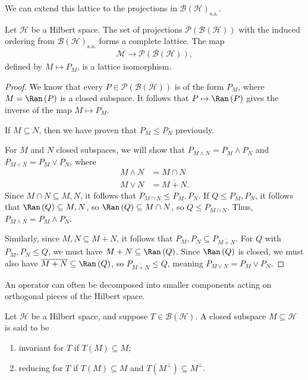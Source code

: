 \documentclass[10pt]{mypackage}
\newcommand{\sa}{\text{s.a.}}
\begin{document}
We can extend this lattice to the projections in $\mathcal{B}\left(\mathcal{H}\right)_{\sa}$.
\begin{proposition}
  Let $\mathcal{H}$ be a Hilbert space. The set of projections $\mathcal{P}\left(\mathcal{B}\left(\mathcal{H}\right)\right)$ with the induced ordering from $\mathcal{B}\left(\mathcal{H}\right)_{\sa}$ forms a complete lattice. The map
  \begin{align*}
    \mathcal{M}\rightarrow \mathcal{P}\left(\mathcal{B}\left(\mathcal{H}\right)\right),
  \end{align*}
  defined by $M\mapsto P_M$, is a lattice isomorphism.
\end{proposition}
\begin{proof}
  We know that every $P\in \mathcal{P}\left(\mathcal{B}\left(\mathcal{H}\right)\right)$ is of the form $P_M$, where $M = \Ran\left(P\right)$ is a closed subspace. It follows that $P\mapsto \Ran\left(P\right)$ gives the inverse of the map $M\mapsto P_M$.\newline

  If $M\subseteq N$, then we have proven that $P_M\leq P_N$ previously.\newline

  For $M$ and $N$ closed subspaces, we will show that $P_{M\wedge N} = P_M\wedge P_N$ and $P_{M\vee N} = P_M\vee P_N$, where
  \begin{align*}
    M\wedge N &= M\cap N\\
    M\vee N &= \overline{M+N}.
  \end{align*}
  Since $M\cap N\subseteq M,N$, it follows that $P_{M\cap N}\leq P_M,P_N$. If $Q\leq P_{M},P_N$, it follows that $\Ran\left(Q\right)\subseteq M,N$, so $\Ran\left(Q\right)\subseteq M\cap N$, so $Q\leq P_{M\cap N}$. Thus, $P_{M\wedge N} = P_M\wedge P_N$.\newline

  Similarly, since $M,N\subseteq \overline{M+N}$, it follows that $P_M,P_N\subseteq P_{\overline{M+N}}$. For $Q$ with $P_M,P_N\leq Q$, we must have $M+N\subseteq \Ran\left(Q\right)$. Since $\Ran\left(Q\right)$ is closed, we must also have $\overline{M+N}\subseteq \Ran\left(Q\right)$, so $P_{\overline{M+N}}\leq Q$, meaning $P_{M\vee N} = P_{M}\vee P_N$.
\end{proof}
An operator can often be decomposed into smaller components acting on orthogonal pieces of the Hilbert space.
\begin{definition}
  Let $\mathcal{H}$ be a Hilbert space, and suppose $T\in \mathcal{B}\left(\mathcal{H}\right)$. A closed subspace $M\subseteq \mathcal{H}$ is said to be
  \begin{enumerate}[(1)]
    \item invariant for $T$ if $T\left(M\right)\subseteq M$;
    \item reducing for $T$ if $T\left(M\right)\subseteq M$ and $T\left(M^{\perp}\right) \subseteq M^{\perp}$.
  \end{enumerate}
\end{definition}
\end{document}
